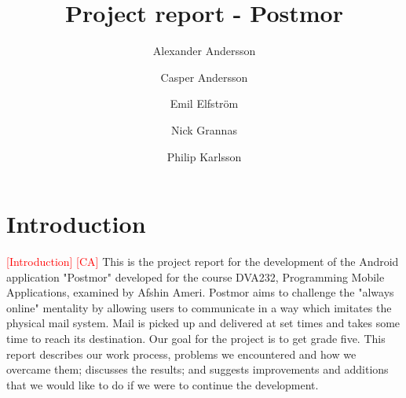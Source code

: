 \documentclass[acmlarge, review=false, screen=true]{acmart}
\begin{document}
\title{Project report - Postmor}

\author{Alexander Andersson}
\author{Casper Andersson}
\author{Emil Elfström}
\author{Nick Grannas}
\author{Philip Karlsson}




\maketitle
  \section{Introduction}
    \textcolor{red}{[Introduction] [CA]} \newline
    This is the project report for the development of the Android application "Postmor" developed for the course DVA232, Programming Mobile Applications, examined by Afshin Ameri. Postmor aims to challenge the "always online" mentality by allowing users to communicate in a way which imitates the physical mail system. Mail is picked up and delivered at set times and takes some time to reach its destination. Our goal for the project is to get grade five. This report describes our work process, problems we encountered and how we overcame them; discusses the results; and suggests improvements and additions that we would like to do if we were to continue the development.
\end{document}
